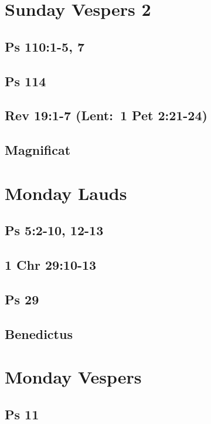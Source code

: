 \section{Sunday Vespers 2}

\subsection{Ps 110:1-5, 7}

\subsection{Ps 114}

\subsection{Rev 19:1-7 (Lent: 1 Pet 2:21-24)}

\subsection{Magnificat}


\section{Monday Lauds}

\subsection{Ps 5:2-10, 12-13}

\subsection{1 Chr 29:10-13}

\subsection{Ps 29}

\subsection{Benedictus}


\section{Monday Vespers}

\subsection{Ps 11}

